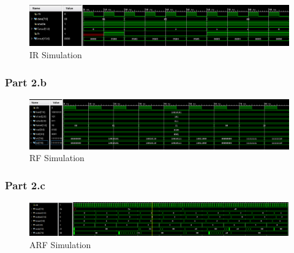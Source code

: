 \documentclass[pdftex,12pt,a4paper]{article}
\begin{document}
\begin{figure}[H]
	\centering
	\includegraphics[width=1\textwidth]{results/ir.png}	
	\caption{IR Simulation}
	\label{IR Simulation}
\end{figure}


\subsubsection{Part 2.b}

\begin{figure}[H]
	\centering
	\includegraphics[width=1\textwidth]{results/rf.png}	
	\caption{RF Simulation}
	\label{RF Simulation}
\end{figure}





\subsubsection{Part 2.c}
\begin{figure}[H]
	\centering
	\includegraphics[width=1\textwidth]{results/arf.png}	
	\caption{ARF Simulation}
	\label{ARF Simulation}
\end{figure}
\end{document}
